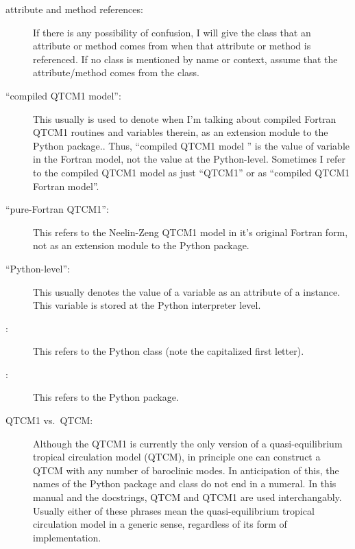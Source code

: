 \begin{description}
\item[attribute and method references:]
	If there is any possibility of confusion, I will give the
	class that an attribute or method comes from when that
	attribute or method is referenced.  If no class is mentioned
	by name or context,
	assume that the attribute/method comes from the
	 class.

\item[``compiled QTCM1 model'':]
	This usually is used to denote when I'm talking about
	compiled Fortran QTCM1 routines and variables therein,
	as an extension module to the Python  package..
	Thus, ``compiled QTCM1 model '' is the value
	of variable  in the Fortran model, not the
	value at the Python-level.  Sometimes I refer to the
	compiled QTCM1 model as just ``QTCM1'' or as
	``compiled QTCM1 Fortran model''.

\item[``pure-Fortran QTCM1'':]
	This refers to the Neelin-Zeng QTCM1 model in it's
	original Fortran form, not as an extension module to
	the Python  package.

\item[``Python-level'':]
	This usually denotes the value of a variable as an
	attribute of a  instance.  This variable
	is stored at the Python interpreter level.

\item[:]
	This refers to the Python  class
	(note the capitalized first letter).

\item[:]
	This refers to the Python  package.

\item[QTCM1 vs.\ QTCM:]
	Although the QTCM1 is currently the only version of a
	quasi-equilibrium tropical circulation model (QTCM), in
	principle one can construct a QTCM with any number of
	baroclinic modes.  In anticipation of this, the names of
	the Python package and class do not end in a numeral.  In
	this manual and the  docstrings, QTCM and QTCM1
	are used interchangably.
	Usually either of these phrases mean the quasi-equilibrium
	tropical circulation model in a generic sense, regardless
	of its form of implementation.
\end{description}




